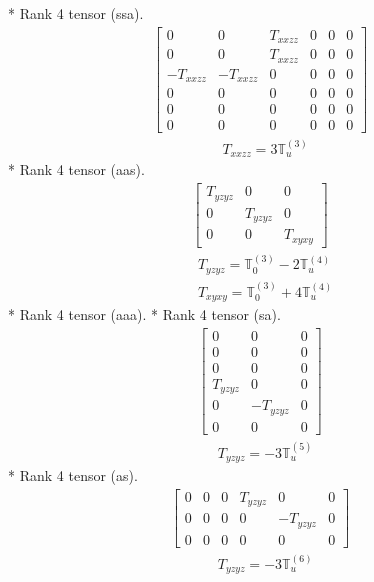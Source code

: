\documentclass[fleqn,8pt,landscape]{jsarticle}
\begin{document}
* Rank 4 tensor (ssa).
\begin{align*}
\begin{bmatrix} 0 & 0 & T_{xxzz} & 0 & 0 & 0 \\ 0 & 0 & T_{xxzz} & 0 & 0 & 0 \\ - T_{xxzz} & - T_{xxzz} & 0 & 0 & 0 & 0 \\ 0 & 0 & 0 & 0 & 0 & 0 \\ 0 & 0 & 0 & 0 & 0 & 0 \\ 0 & 0 & 0 & 0 & 0 & 0 \end{bmatrix}
\end{align*}
\begin{align*}
& T_{xxzz} = 3 \mathbb{T}_{u}^{(3)}
\end{align*}
* Rank 4 tensor (aas).
\begin{align*}
\begin{bmatrix} T_{yzyz} & 0 & 0 \\ 0 & T_{yzyz} & 0 \\ 0 & 0 & T_{xyxy} \end{bmatrix}
\end{align*}
\begin{align*}
& T_{yzyz} = \mathbb{T}_{0}^{(3)} - 2 \mathbb{T}_{u}^{(4)} \\
& T_{xyxy} = \mathbb{T}_{0}^{(3)} + 4 \mathbb{T}_{u}^{(4)}
\end{align*}
* Rank 4 tensor (aaa).
* Rank 4 tensor (sa).
\begin{align*}
\begin{bmatrix} 0 & 0 & 0 \\ 0 & 0 & 0 \\ 0 & 0 & 0 \\ T_{yzyz} & 0 & 0 \\ 0 & - T_{yzyz} & 0 \\ 0 & 0 & 0 \end{bmatrix}
\end{align*}
\begin{align*}
& T_{yzyz} = - 3 \mathbb{T}_{u}^{(5)}
\end{align*}
* Rank 4 tensor (as).
\begin{align*}
\begin{bmatrix} 0 & 0 & 0 & T_{yzyz} & 0 & 0 \\ 0 & 0 & 0 & 0 & - T_{yzyz} & 0 \\ 0 & 0 & 0 & 0 & 0 & 0 \end{bmatrix}
\end{align*}
\begin{align*}
& T_{yzyz} = - 3 \mathbb{T}_{u}^{(6)}
\end{align*}
\end{document}
